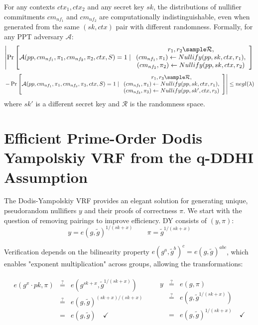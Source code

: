 \begin{property}[Unlinkability]
For any contexts $ctx_1, ctx_2$ and any secret key $sk$, the distributions of nullifier commitments $cm_{nf_1}$ and $cm_{nf_2}$ are computationally indistinguishable, even when generated from the same $(sk, ctx)$ pair with different randomness. Formally, for any PPT adversary $\mathcal{A}$:
$$\left|\Pr\left[\mathcal{A}(pp, cm_{nf_1}, \pi_1, cm_{nf_2}, \pi_2, ctx, S) = 1 \mid \begin{array}{c} 
r_1, r_2 \sample \mathcal{R}, \\ 
(cm_{nf_1}, \pi_1) \leftarrow Nullify(pp, sk, ctx, r_1), \\
(cm_{nf_2}, \pi_2) \leftarrow Nullify(pp, sk, ctx, r_2)
\end{array}\right]\right.$$
$$\left. - \Pr\left[\mathcal{A}(pp, cm_{nf_1}, \pi_1, cm_{nf_3}, \pi_3, ctx, S) = 1 \mid \begin{array}{c} 
r_1, r_3 \sample \mathcal{R}, \\ 
(cm_{nf_1}, \pi_1) \leftarrow Nullify(pp, sk, ctx, r_1), \\
(cm_{nf_3}, \pi_3) \leftarrow Nullify(pp, sk', ctx, r_3)
\end{array}\right]\right| \leq negl(\lambda)$$
where $sk'$ is a different secret key and $\mathcal{R}$ is the randomness space.
\end{property}





\section{Efficient Prime-Order Dodis Yampolskiy VRF from the q-DDHI Assumption}\label{sec:vrf-prime-order}

The Dodis-Yampolskiy \cite{hutchison_verifiable_2005} VRF provides an elegant solution for generating unique, pseudorandom nullifiers $y$ and their proofs of correctness $\pi$. We start with the question of removing pairings to improve efficiency. DY consists of $(y, \pi)$:
\[
y = e(g, \tilde{g})^{1/(sk+x)} \qquad \pi = \tilde{g}^{1/(sk+x)}
\]

Verification depends on the bilinearity property $e(g^a, \tilde{g}^b)^c = e(g, \tilde{g})^{abc}$, which enables "exponent multiplication" across groups, allowing the transformations:

\begin{align*}
    \begin{array}{rcl}
    e(g^x \cdot pk, \pi) & \stackrel{?}{=} & e(g^{sk+x}, \tilde{g}^{1/(sk+x)}) \\
     & \stackrel{?}{=} & e(g, \tilde{g})^{(sk+x)/(sk+x)} \\
     & = & e(g, \tilde{g}) \quad \checkmark
    \end{array}
    &&
    \begin{array}{rcl}
    y & \stackrel{?}{=} & e(g, \pi) \\
     & \stackrel{?}{=} & e(g,\tilde{g}^{1/(sk+x)}) \\
     & = & e(g, \tilde{g})^{1/(sk+x)} \quad \checkmark
    \end{array}
\end{align*}

